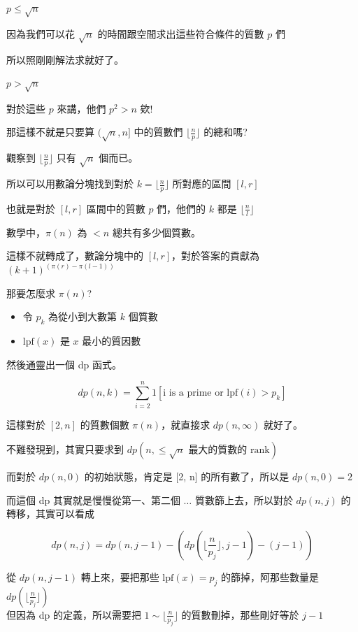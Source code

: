 \begin{frame}{}
    $p \le \sqrt{n}$

    因為我們可以花 $\sqrt{n}$ 的時間跟空間求出這些符合條件的質數 $p$ 們

    所以照剛剛解法求就好了。\pause

    $p > \sqrt{n}$

    對於這些 $p$ 來講，他們 $p^2 > n$ 欸!

    那這樣不就是只要算 $(\sqrt{n}, n]$ 中的質數們 $\lfloor \frac{n}{p} \rfloor$ 的總和嗎?
\end{frame}

\begin{frame}{}
    觀察到 $\lfloor \frac{n}{p} \rfloor$ 只有 $\sqrt{n}$ 個而已。

    所以可以用數論分塊找到對於 $k = \lfloor \frac{n}{p} \rfloor$ 所對應的區間 $[l, r]$

    也就是對於 $[l, r]$ 區間中的質數 $p$ 們，他們的 $k$ 都是 $\lfloor \frac{n}{l} \rfloor$\pause

    數學中，$\pi(n)$ 為 $< n$ 總共有多少個質數。

    這樣不就轉成了，數論分塊中的 $[l, r]$，對於答案的貢獻為 $(k+1)^{(\pi(r) - \pi(l-1))}$\pause

    那要怎麼求 $\pi(n)$?
\end{frame}

\begin{frame}{}
    \begin{itemize}
        \item {令 $p_k$ 為從小到大數第 $k$ 個質數}
        \item {$\text{lpf}(x)$ 是 $x$ 最小的質因數}
    \end{itemize}\pause

    然後通靈出一個 dp 函式。

    $$
    dp(n, k) = \sum^{n}_{i = 2} 1[\text{i is a prime or } \text{lpf}(i) > p_k]
    $$

    這樣對於 $[2, n]$ 的質數個數 $\pi(n)$，就直接求 $dp(n, \infty)$ 就好了。
\end{frame}

\begin{frame}{}
    不難發現到，其實只要求到 $dp(n, \le \sqrt{n}\text{ 最大的質數的 rank})$

    而對於 $dp(n, 0)$ 的初始狀態，肯定是 [2, n] 的所有數了，所以是 $dp(n, 0) = 2$

    而這個 dp 其實就是慢慢從第一、第二個 $\ldots$ 質數篩上去，所以對於 $dp(n, j)$ 的轉移，其實可以看成

    $$
    dp(n, j) = dp(n, j-1) - (dp(\lfloor \frac{n}{p_j} \rfloor, j-1) - (j-1))
    $$

    從 $dp(n, j-1)$ 轉上來，要把那些 $\text{lpf}(x) = p_j$ 的篩掉，阿那些數量是 $dp(\lfloor \frac{n}{p_j} \rfloor)$\\
    但因為 dp 的定義，所以需要把 $1 \sim \lfloor \frac{n}{p_j} \rfloor$ 的質數刪掉，那些剛好等於 $j-1$
\end{frame}

